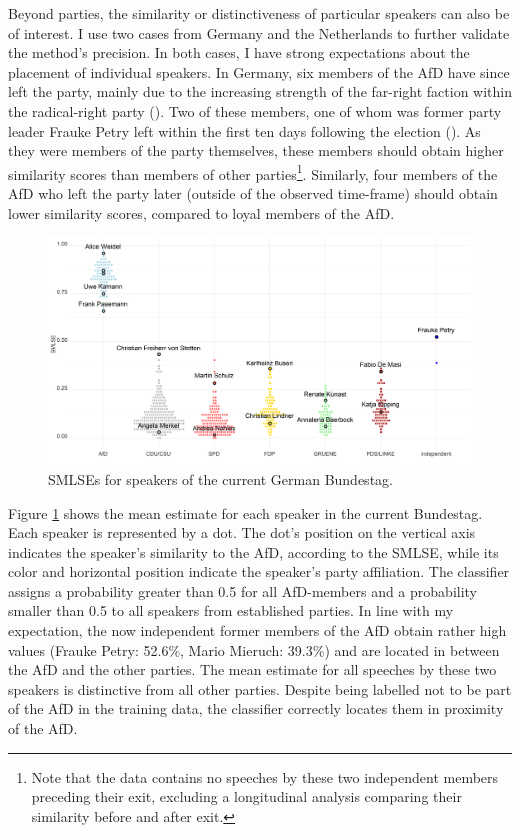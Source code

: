 \documentclass{article}
\begin{document}
Beyond parties, the similarity or distinctiveness of particular speakers can also be of interest. I use two cases from Germany and the Netherlands to further validate the method's precision. In both cases, I have strong expectations about the placement of individual speakers. In Germany, six members of the AfD have since left the party, mainly due to the increasing strength of the far-right faction within the radical-right party (\cite{Steffen2020AfD}). Two of these members, one of whom was former party leader Frauke Petry left within the first ten days following the election (\cite{LSE2018AfD}). As they were members of the party themselves, these members should obtain higher similarity scores than members of other parties\footnote{Note that the data contains no speeches by these two independent members preceding their exit, excluding a longitudinal analysis comparing their similarity before and after exit.}. Similarly, four members of the AfD who left the party later (outside of the observed time-frame) should obtain lower similarity scores, compared to loyal members of the AfD. \par

\begin{figure}
    \centering
    \includegraphics[width=19cm]{DE/vis/DE_speakers.png}
    \caption{SMLSEs for speakers of the current German Bundestag.}
    \label{fig:speakers}
\end{figure}


Figure \ref{fig:speakers} shows the mean estimate for each speaker in the current Bundestag. Each speaker is represented by a dot. The dot's position on the vertical axis indicates the speaker's similarity to the AfD, according to the SMLSE, while its color and horizontal position indicate the speaker's party affiliation. The classifier assigns a probability greater than 0.5 for all AfD-members and a probability smaller than 0.5 to all speakers from established parties. In line with my expectation, the now independent former members of the AfD obtain rather high values (Frauke Petry: 52.6\%, Mario Mieruch: 39.3\%) and are located in between the AfD and the other parties. The mean estimate for all speeches by these two speakers is distinctive from all other parties. Despite being labelled not to be part of the AfD in the training data, the classifier correctly locates them in proximity of the AfD. \par
\end{document}

